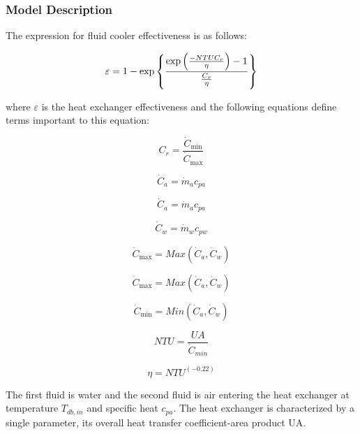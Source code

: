 \subsubsection{Model Description}\label{model-description-2-005}

The expression for fluid cooler effectiveness is as follows:

\begin{equation}
  \varepsilon = 1-\exp{\left\{ \frac{\exp{\left(\frac{-NTU C_r}{\eta}\right)}-1}{\frac{C_{r}}{\eta}} \right\}}
\end{equation}

where \(\varepsilon\) is the heat exchanger effectiveness and the following equations define terms important to this equation:

\begin{equation}
{C_r} = \frac{{{{\dot C}_{\min }}}}{{{{\dot C}_{\max }}}}
\end{equation}

\begin{equation}
{\dot C_a} = {\dot m_a}{c_{pa}}
\end{equation}

\begin{equation}
{\dot C_a} = {\dot m_a}{c_{pa}}
\end{equation}

\begin{equation}
{\dot C_w} = {\dot m_w}{c_{pw}}
\end{equation}

\begin{equation}
{\dot C_{\max }} = Max({\dot C_a},{\dot C_w})
\end{equation}

\begin{equation}
{\dot C_{\max }} = Max({\dot C_a},{\dot C_w})
\end{equation}

\begin{equation}
{\dot C_{\min }} = Min({\dot C_a},{\dot C_w})
\end{equation}

\begin{equation}
NTU = \frac{{UA}}{{{{\dot C}_{min}}}}
\end{equation}

\begin{equation}
\eta = NT{U^{(-0.22)}}
\end{equation}

The first fluid is water and the second fluid is air entering the heat exchanger at temperature \({T_{db,in}}\) and specific heat \({c_{pa}}\). The heat exchanger is characterized by a single parameter, its overall heat transfer coefficient-area product UA.

